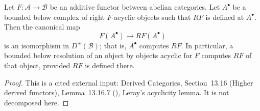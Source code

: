 \begin{lemma}
\label{lem:pc-leray-acyclicity}
Let $F:\mathcal A\to\mathcal B$ be an additive functor between abelian
categories.
Let $A^\bullet$ be a bounded below complex of right $F$-acyclic objects
such that $RF$ is defined at $A^\bullet$.  Then the canonical map
\[
F(A^\bullet)\longrightarrow RF(A^\bullet)
\]
is an isomorphism in $D^+(\mathcal B)$; that is, $A^\bullet$ computes
$RF$.
In particular, a bounded below resolution of an object by objects
acyclic for $F$ computes $RF$ of that object, provided $RF$ is defined
there.
\end{lemma}
\begin{proof}
This is a cited external input: Derived Categories, Section~13.16
(Higher derived functors), Lemma~13.16.7 (),
Leray's acyclicity lemma.  It is not decomposed here.
\end{proof}

